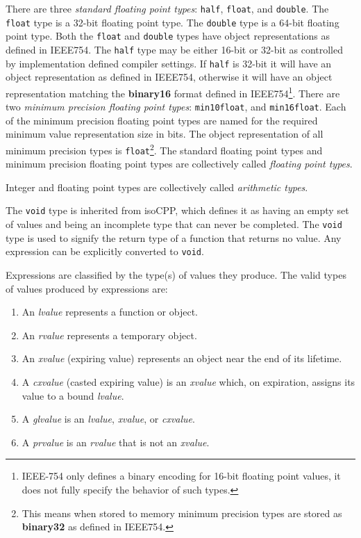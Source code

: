 \p There are three \textit{standard floating point types}: \texttt{half},
\texttt{float}, and \texttt{double}. The \texttt{float} type is a 32-bit
floating point type. The \texttt{double} type is a 64-bit floating point type.
Both the \texttt{float} and \texttt{double} types have object representations as
defined in \gls{IEEE754}. The \texttt{half} type may be either 16-bit or 32-bit
as controlled by implementation defined compiler settings. If \texttt{half} is
32-bit it will have an object representation as defined in \gls{IEEE754},
otherwise it will have an object representation matching the \textbf{binary16}
format defined in \gls{IEEE754}\footnote{IEEE-754 only defines a binary encoding
for 16-bit floating point values, it does not fully specify the behavior of such
types.}. There are two \textit{minimum precision floating point types}:
\texttt{min10float}, and \texttt{min16float}. Each of the minimum precision
floating point types are named for the required minimum value representation
size in bits. The object representation of all minimum precision types is
\texttt{float}\footnote{This means when stored to memory minimum precision types
are stored as \textbf{binary32} as defined in \gls{IEEE754}.}. The standard
floating point types and minimum precision floating point types are collectively
called \textit{floating point types}.

\p Integer and floating point types are collectively called \textit{arithmetic
types}.

\p The \texttt{void} type is inherited from \gls{isoCPP}, which defines it as
having an empty set of values and being an incomplete type that can never be
completed. The \texttt{void} type is used to signify the return type of a
function that returns no value. Any expression can be explicitly converted to
\texttt{void}.


\p Expressions are classified by the type(s) of values they produce. The valid
types of values produced by expressions are:

\begin{enumerate}
  \item An \textit{lvalue} represents a function or object.
  \item An \textit{rvalue} represents a temporary object.
  \item An \textit{xvalue} (expiring value) represents an object near the end
  of its lifetime.
  \item A \textit{cxvalue} (casted expiring value) is an \textit{xvalue}
  which, on expiration, assigns its value to a bound \textit{lvalue}.
  \item A \textit{glvalue} is an \textit{lvalue}, \textit{xvalue}, or
  \textit{cxvalue}.
  \item A \textit{prvalue} is an \textit{rvalue} that is not an \textit{xvalue}.
\end{enumerate}

